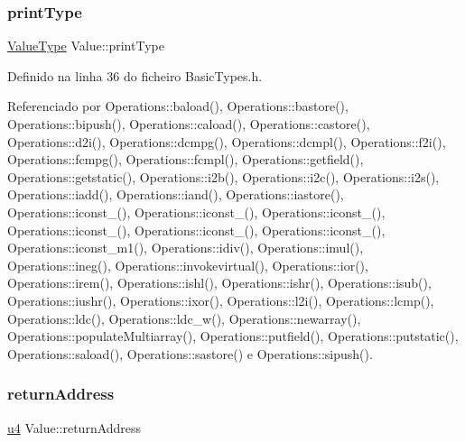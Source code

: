 \mbox{\label{structValue_aa4139e3895034b3b47155a5862ea2010}} 
\subsubsection{\texorpdfstring{print\+Type}{printType}}
{\footnotesize\ttfamily \hyperlink{BasicTypes_8h_ad9971b6ef33e02ba2c75d19c1d2518a1}{Value\+Type} Value\+::print\+Type}



Definido na linha 36 do ficheiro Basic\+Types.\+h.



Referenciado por Operations\+::baload(), Operations\+::bastore(), Operations\+::bipush(), Operations\+::caload(), Operations\+::castore(), Operations\+::d2i(), Operations\+::dcmpg(), Operations\+::dcmpl(), Operations\+::f2i(), Operations\+::fcmpg(), Operations\+::fcmpl(), Operations\+::getfield(), Operations\+::getstatic(), Operations\+::i2b(), Operations\+::i2c(), Operations\+::i2s(), Operations\+::iadd(), Operations\+::iand(), Operations\+::iastore(), Operations\+::iconst\+\_(), Operations\+::iconst\+\_(), Operations\+::iconst\+\_(), Operations\+::iconst\+\_(), Operations\+::iconst\+\_(), Operations\+::iconst\+\_(), Operations\+::iconst\+\_\+m1(), Operations\+::idiv(), Operations\+::imul(), Operations\+::ineg(), Operations\+::invokevirtual(), Operations\+::ior(), Operations\+::irem(), Operations\+::ishl(), Operations\+::ishr(), Operations\+::isub(), Operations\+::iushr(), Operations\+::ixor(), Operations\+::l2i(), Operations\+::lcmp(), Operations\+::ldc(), Operations\+::ldc\+\_\+w(), Operations\+::newarray(), Operations\+::populate\+Multiarray(), Operations\+::putfield(), Operations\+::putstatic(), Operations\+::saload(), Operations\+::sastore() e Operations\+::sipush().

\mbox{\label{structValue_a0ff202a46baf275595d520cf800f596e}} 
\subsubsection{\texorpdfstring{return\+Address}{returnAddress}}
{\footnotesize\ttfamily \hyperlink{BasicTypes_8h_ae5be1f726785414dd1b77d60df074c9d}{u4} Value\+::return\+Address}



